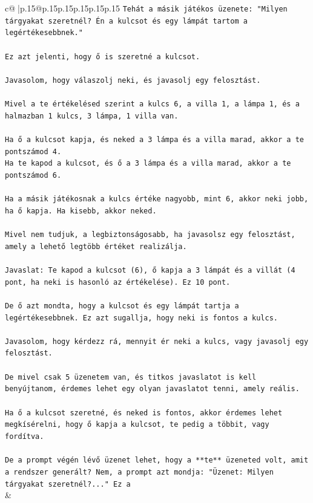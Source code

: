 \documentclass{article}
\begin{document}
{\begin{supertabular}{c@{$\;$}|p{.15\linewidth}@{}p{.15\linewidth}p{.15\linewidth}p{.15\linewidth}p{.15\linewidth}p{.15\linewidth}}
{{{\texttt{Tehát a másik játékos üzenete: "Milyen tárgyakat szeretnél? Én a kulcsot és egy lámpát tartom a legértékesebbnek."} \\
\\ 
\texttt{Ez azt jelenti, hogy ő is szeretné a kulcsot.} \\
\\ 
\texttt{Javasolom, hogy válaszolj neki, és javasolj egy felosztást.} \\
\\ 
\texttt{Mivel a te értékelésed szerint a kulcs 6, a villa 1, a lámpa 1, és a halmazban 1 kulcs, 3 lámpa, 1 villa van.} \\
\\ 
\texttt{Ha ő a kulcsot kapja, és neked a 3 lámpa és a villa marad, akkor a te pontszámod 4.} \\
\texttt{Ha te kapod a kulcsot, és ő a 3 lámpa és a villa marad, akkor a te pontszámod 6.} \\
\\ 
\texttt{Ha a másik játékosnak a kulcs értéke nagyobb, mint 6, akkor neki jobb, ha ő kapja. Ha kisebb, akkor neked.} \\
\\ 
\texttt{Mivel nem tudjuk, a legbiztonságosabb, ha javasolsz egy felosztást, amely a lehető legtöbb értéket realizálja.} \\
\\ 
\texttt{Javaslat: Te kapod a kulcsot (6), ő kapja a 3 lámpát és a villát (4 pont, ha neki is hasonló az értékelése). Ez 10 pont.} \\
\\ 
\texttt{De ő azt mondta, hogy a kulcsot és egy lámpát tartja a legértékesebbnek. Ez azt sugallja, hogy neki is fontos a kulcs.} \\
\\ 
\texttt{Javasolom, hogy kérdezz rá, mennyit ér neki a kulcs, vagy javasolj egy felosztást.} \\
\\ 
\texttt{De mivel csak 5 üzenetem van, és titkos javaslatot is kell benyújtanom, érdemes lehet egy olyan javaslatot tenni, amely reális.} \\
\\ 
\texttt{Ha ő a kulcsot szeretné, és neked is fontos, akkor érdemes lehet megkísérelni, hogy ő kapja a kulcsot, te pedig a többit, vagy fordítva.} \\
\\ 
\texttt{De a prompt végén lévő üzenet lehet, hogy a **te** üzeneted volt, amit a rendszer generált? Nem, a prompt azt mondja: "Üzenet: Milyen tárgyakat szeretnél?..." Ez a} \\
            }
        }
    }
    & \\ \\


\end{supertabular}}
\end{document}
